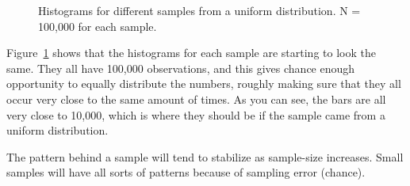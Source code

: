 \documentclass[
  letterpaper,
  DIV=11,
  numbers=noendperiod]{scrreprt}
\begin{document}
\begin{figure}


\caption{\label{fig-5sampunifALOT}Histograms for different samples from
a uniform distribution. N = 100,000 for each sample.}

\end{figure}%

Figure~\ref{fig-5sampunifALOT} shows that the histograms for each sample
are starting to look the same. They all have 100,000 observations, and
this gives chance enough opportunity to equally distribute the numbers,
roughly making sure that they all occur very close to the same amount of
times. As you can see, the bars are all very close to 10,000, which is
where they should be if the sample came from a uniform distribution.

\begin{tcolorbox}[enhanced jigsaw, title=\textcolor{quarto-callout-tip-color}{\faLightbulb}\hspace{0.5em}{Pro tip}, colframe=quarto-callout-tip-color-frame, colbacktitle=quarto-callout-tip-color!10!white, bottomtitle=1mm, leftrule=.75mm, rightrule=.15mm, titlerule=0mm, arc=.35mm, colback=white, opacitybacktitle=0.6, toprule=.15mm, toptitle=1mm, bottomrule=.15mm, coltitle=black, breakable, left=2mm, opacityback=0]

The pattern behind a sample will tend to stabilize as sample-size
increases. Small samples will have all sorts of patterns because of
sampling error (chance).

\end{tcolorbox}
\end{document}
